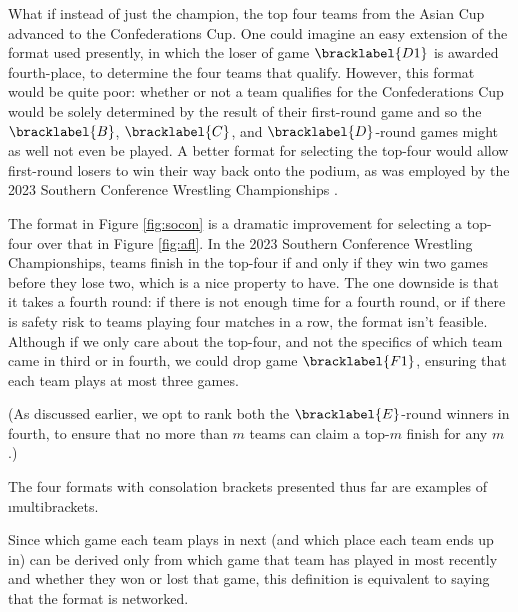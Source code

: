 {    What if instead of just the champion, the top four teams from the Asian Cup advanced to the Confederations Cup. One could imagine an easy extension of the format used presently, in which the loser of game $\bracklabel{D1}$ is awarded fourth-place, to determine the four teams that qualify. However, this format would be quite poor: whether or not a team qualifies for the Confederations Cup would be solely determined by the result of their first-round game and so the $\bracklabel{B}$, $\bracklabel{C}$, and $\bracklabel{D}$-round games might as well not even be played. A better format for selecting the top-four would allow first-round losers to win their way back onto the podium, as was employed by the 2023 Southern Conference Wrestling Championships \cite{wiki_socon}.


    The format in Figure \ref{fig:socon} is a dramatic improvement for selecting a top-four over that in Figure \ref{fig:afl}. In the 2023 Southern Conference Wrestling Championships, teams finish in the top-four if and only if they win two games before they lose two, which is a nice property to have. The one downside is that it takes a fourth round: if there is not enough time for a fourth round, or if there is safety risk to teams playing four matches in a row, the format isn't feasible. Although if we only care about the top-four, and not the specifics of which team came in third or in fourth, we could drop game $\bracklabel{F1}$, ensuring that each team plays at most three games.


    (As discussed earlier, we opt to rank both the $\bracklabel{E}$-round winners in fourth, to ensure that no more than $m$ teams can claim a top-$m$ finish for any $m$.)

    The four formats with consolation brackets presented thus far are examples of \i{multibrackets}.


    Since which game each team plays in next (and which place each team ends up in) can be derived only from which game that team has played in most recently and whether they won or lost that game, this definition is equivalent to saying that the format is networked.
    
}
